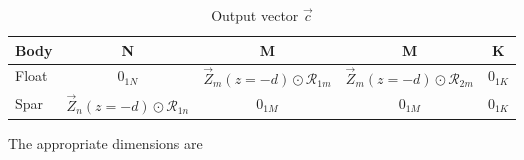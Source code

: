 \documentclass[a4paper,fleqn,colorlinks,unicode,lineno]{cas-dc} %
\makeatletter
\providecommand{\DIFaddtex}[1]{{\protect\color{blue}\uwave{#1}}} %
\providecommand{\DIFdeltex}[1]{{\protect\color{red}\sout{#1}}} %
\providecommand{\DIFaddFL}[1]{\DIFadd{#1}} %
\providecommand{\DIFdelFL}[1]{\DIFdel{#1}} %
\providecommand{\DIFaddbeginFL}{} %
\providecommand{\DIFaddendFL}{} %
\providecommand{\DIFdelbeginFL}{} %
\providecommand{\DIFdelendFL}{} %
\providecommand{\DIFadd}[1]{\texorpdfstring{\DIFaddtex{#1}}{#1}} %
\providecommand{\DIFdel}[1]{\texorpdfstring{\DIFdeltex{#1}}{}} %
\providecommand{\DIFscaledelfig}{0.5}
\newlength{\DIFdelgraphicswidth} %
\newlength{\DIFdelgraphicsheight} %
\providecommand{\DIFaddincludegraphics}[2][]{{\color{blue}\fbox{\DIFOincludegraphics[#1]{#2}}}} %
\providecommand{\DIFdelincludegraphics}[2][]{%
\sbox{\DIFdelgraphicsbox}{\DIFOincludegraphics[#1]{#2}}%
\settoboxwidth{\DIFdelgraphicswidth}{\DIFdelgraphicsbox} %
\settoboxtotalheight{\DIFdelgraphicsheight}{\DIFdelgraphicsbox} %
\scalebox{\DIFscaledelfig}{%
\parbox[b]{\DIFdelgraphicswidth}{\usebox{\DIFdelgraphicsbox}\\[-\baselineskip] \rule{\DIFdelgraphicswidth}{0em}}\llap{\resizebox{\DIFdelgraphicswidth}{\DIFdelgraphicsheight}{%
\setlength{\unitlength}{\DIFdelgraphicswidth}%
\begin{picture}(1,1)%
\thicklines\linethickness{2pt} %
{\color[rgb]{1,0,0}\put(0,0){\framebox(1,1){}}}%
{\color[rgb]{1,0,0}\put(0,0){\line( 1,1){1}}}%
{\color[rgb]{1,0,0}\put(0,1){\line(1,-1){1}}}%
\end{picture}%
}\hspace*{3pt}}} %
} %
\DeclareRobustCommand{\DIFaddbeginFL}{\DIFOaddbeginFL \let\includegraphics\DIFaddincludegraphics} %
\DeclareRobustCommand{\DIFaddendFL}{\DIFOaddendFL \let\includegraphics\DIFOincludegraphics} %
\DeclareRobustCommand{\DIFdelbeginFL}{\DIFOdelbeginFL \let\includegraphics\DIFdelincludegraphics} %
\DeclareRobustCommand{\DIFdelendFL}{\DIFOaddendFL \let\includegraphics\DIFOincludegraphics} %
\let\sout@orig\sout %
\renewcommand{\sout}[1]{\ifmmode\text{\sout@orig{\ensuremath{#1}}}\else\sout@orig{#1}\fi} %
\makeatother
\begin{document}
\begin{table}[h]
    \centering
    \caption{Output vector \DIFdelbeginFL \DIFdelFL{$\vec{c}$}\DIFdelendFL \DIFaddbeginFL \DIFaddFL{$\gls{sym-vec-c}$}\DIFaddendFL }
    \label{tab:MEEM-c-vector}
\begin{tabular}{|l|c|c|c|c|} \hline
          Body&N&  M&  M& K\\ \hline
          Float&\DIFdelbeginFL \DIFdelFL{$0_{1N}$}\DIFdelendFL \DIFaddbeginFL \DIFaddFL{$0_{1\gls{sym-N}}$}\DIFaddendFL &  \DIFdelbeginFL \DIFdelFL{$\vec{Z}_m(z=-d) \odot\boldsymbol{\mathcal{R}}_{1m}$}\DIFdelendFL \DIFaddbeginFL \DIFaddFL{$\gls{sym-vec-Z-m-i2}(\gls{sym-z}=-d) \odot\gls{sym-boldsymbol-mathcal-R}_{1\gls{sym-m}}$}\DIFaddendFL &  \DIFdelbeginFL \DIFdelFL{$\vec{Z}_m(z=-d) \odot\boldsymbol{\mathcal{R}}_{2m}$}\DIFdelendFL \DIFaddbeginFL \DIFaddFL{$\gls{sym-vec-Z-m-i2}(\gls{sym-z}=-d) \odot\gls{sym-boldsymbol-mathcal-R}_{2\gls{sym-m}}$}\DIFaddendFL & \DIFdelbeginFL \DIFdelFL{$0_{1K}$}\DIFdelendFL \DIFaddbeginFL \DIFaddFL{$0_{1\gls{sym-K}}$}\DIFaddendFL \\ \hline
          Spar& \DIFdelbeginFL \DIFdelFL{$\vec{Z}_n(z=-d) \odot\boldsymbol{\mathcal{R}}_{1n}$}\DIFdelendFL \DIFaddbeginFL \DIFaddFL{$\gls{sym-vec-Z-n-i1}(\gls{sym-z}=-d) \odot\gls{sym-boldsymbol-mathcal-R}_{1\gls{sym-n}}$}\DIFaddendFL & \DIFdelbeginFL \DIFdelFL{$0_{1M}$}\DIFdelendFL \DIFaddbeginFL \DIFaddFL{$0_{1\gls{sym-M}}$}\DIFaddendFL & \DIFdelbeginFL \DIFdelFL{$0_{1M}$}\DIFdelendFL \DIFaddbeginFL \DIFaddFL{$0_{1\gls{sym-M}}$}\DIFaddendFL &\DIFdelbeginFL \DIFdelFL{$0_{1K}$}\DIFdelendFL \DIFaddbeginFL \DIFaddFL{$0_{1\gls{sym-K}}$}\DIFaddendFL \\\hline
    \end{tabular}
    \end{table}
The appropriate dimensions are
\end{document}
